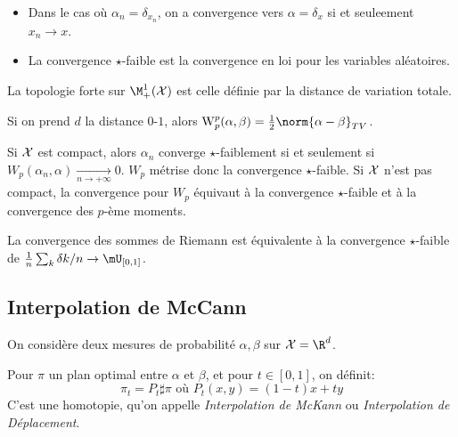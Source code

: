 \begin{remarque}
	\begin{itemize}
		\item Dans le cas où $\alpha_{n} = \delta_{x_{n}}$, on a convergence vers $\alpha = \delta_x$ si et seuleement $x_{n} \to x$.
		\item La convergence $\star$-faible est la convergence en loi pour les variables aléatoires.
	\end{itemize}
\end{remarque}

\begin{definition}
	La topologie forte sur $\M_{+}^{1}(\X)$ est celle définie par la distance de variation totale.
\end{definition}

\begin{proposition}
	Si on prend $d$ la distance $0$-$1$, alors $\Wass_{p}^{p}(\alpha, \beta) = \frac{1}{2}\norm{\alpha -\beta}_{TV}$.
\end{proposition}

\begin{proposition}
	Si $\mathcal{X}$ est compact, alors $\alpha_{n}$ converge $\star$-faiblement si et seulement si $W_{p}(\alpha_{n}, \alpha) \xrightarrow[n \to +\infty]{} 0$.
	$W_{p}$ métrise donc la convergence $\star$-faible.
	Si $\mathcal{X}$ n'est pas compact, la convergence pour $W_{p}$ équivaut à la convergence $\star$-faible et à la convergence des $p$-ème moments.
\end{proposition}

La convergence des sommes de Riemann est équivalente à la convergence $\star$-faible de $\frac{1}{n}\sum_{k} \delta{k/n} \to \mU_{[0, 1]}$.

\subsection{Interpolation de McCann}
On considère deux mesures de probabilité $\alpha, \beta$ sur $\X = \R^{d}$.

\begin{definition}
	Pour $\pi$ un plan optimal entre $\alpha$ et $\beta$, et pour $t \in [0, 1]$, on définit:
	\begin{equation*}
		\pi_{t} = P_{t}\sharp \pi \text{ où } P_{t}(x, y) = (1-t)x + ty
	\end{equation*}
	C'est une homotopie, qu'on appelle \emph{Interpolation de McKann} ou \emph{Interpolation de Déplacement}.
\end{definition}


